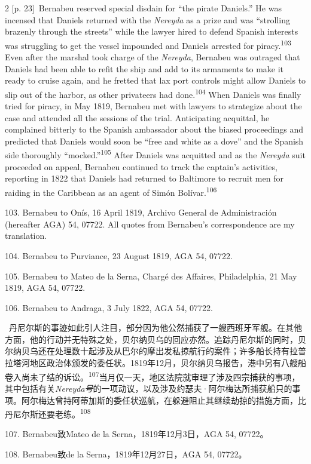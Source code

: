 \documentclass[10pt,a4paper]{article}
\begin{document}
\begin{paracol}{2}
{\scriptsize\color{gray} [p. 23]}\ Bernabeu reserved special disdain for “the pirate Daniels.” He was incensed that Daniels returned with the \textit{Nereyda} as a prize and was “strolling brazenly through the streets” while the lawyer hired to defend Spanish interests was struggling to get the vessel impounded and Daniels arrested for piracy.\nobreak\textsuperscript{103} Even after the marshal took charge of the \textit{Nereyda}, Bernabeu was outraged that Daniels had been able to refit the ship and add to its armaments to make it ready to cruise again, and he fretted that lax port controls might allow Daniels to slip out of the harbor, as other privateers had done.\nobreak\textsuperscript{104} When Daniels was finally tried for piracy, in May 1819, Bernabeu met with lawyers to strategize about the case and attended all the sessions of the trial. Anticipating acquittal, he complained bitterly to the Spanish ambassador about the biased proceedings and predicted that Daniels would soon be “free and white as a dove” and the Spanish side thoroughly “mocked.”\nobreak\textsuperscript{105} After Daniels was acquitted and as the \textit{Nereyda} suit proceeded on appeal, Bernabeu continued to track the captain’s activities, reporting in 1822 that Daniels had returned to Baltimore to recruit men for raiding in the Caribbean as an agent of Simón Bolívar.\nobreak\textsuperscript{106}\par{\small 103. Bernabeu to Onís, 16 April 1819, Archivo General de Administración (hereafter AGA) 54, 07722. All quotes from Bernabeu’s correspondence are my translation.\par}{\small 104. Bernabeu to Purviance, 23 August 1819, AGA 54, 07722.\par}{\small 105. Bernabeu to Mateo de la Serna, Chargé des Affaires, Philadelphia, 21 May 1819, AGA 54, 07722.\par}{\small 106. Bernabeu to Andraga, 3 July 1822, AGA 54, 07722.\par}
\switchcolumn*
{\scriptsize\color{gray} [p. 24]}\ 丹尼尔斯的事迹如此引人注目，部分因为他公然捕获了一艘西班牙军舰。在其他方面，他的行动并无特殊之处，贝尔纳贝乌的回应亦然。追踪丹尼尔斯的同时，贝尔纳贝乌还在处理数十起涉及从巴尔的摩出发私掠航行的案件；许多船长持有拉普拉塔河地区政治体颁发的委任状。1819年12月，贝尔纳贝乌报告，港中另有八艘船卷入尚未了结的诉\mbox{讼。\textsuperscript{107}}当月仅一天，地区法院就审理了涉及四宗捕获的事项，其中包括有关\textit{Nereyda号}的一项动议，以及涉及约瑟夫·阿尔梅达所捕获船只的事项。阿尔梅达曾持阿蒂加斯的委任状巡航，在躲避阻止其继续劫掠的措施方面，比丹尼尔斯还要老\mbox{练。\textsuperscript{108}}\par{\small 107. Bernabeu致Mateo de la Serna，1819年12月3日，AGA 54, 07722。\par}{\small 108. Bernabeu致de la Serna，1819年12月27日，AGA 54, 07722。\par}

\end{paracol}
\end{document}

